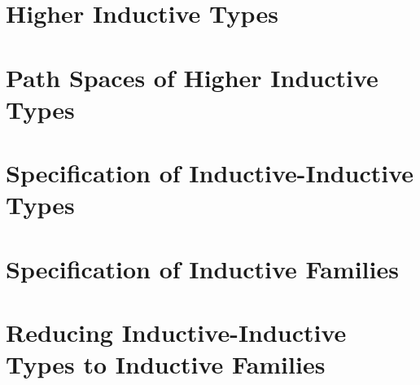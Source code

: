 \documentclass[12pt,headings=optiontohead,openany,oneside,a4paper]{book}
\theoremstyle{definition}
\begin{document}


\chapter{Higher Inductive Types}\label{chp:hit}



\chapter{Path Spaces of Higher Inductive Types}\label{chp:paths}



\chapter{Specification of Inductive-Inductive Types}\label{chp:iit}


%

\chapter{Specification of Inductive Families}\label{chp:if}



\chapter{Reducing Inductive-Inductive Types to Inductive Families}\label{chp:red}





\end{document}
